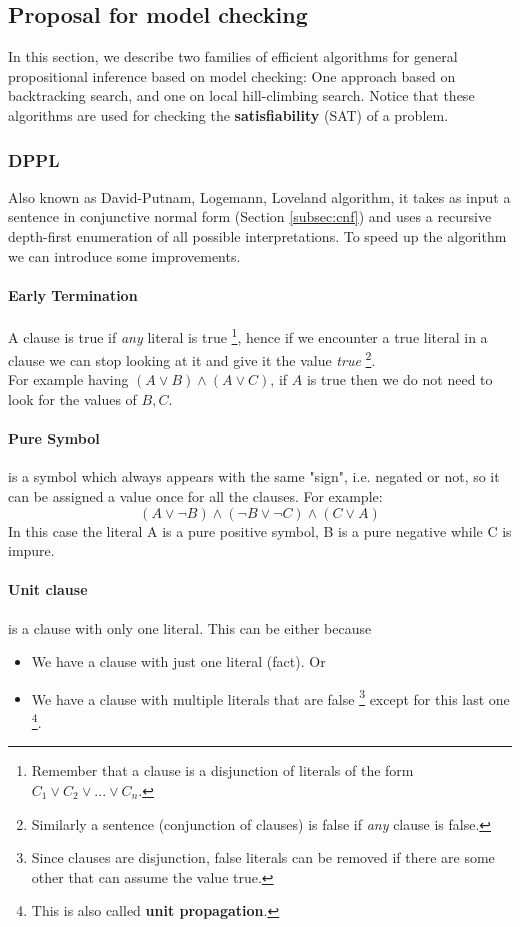 \documentclass[10pt,a4paper]{article}
\begin{document}
\subsection{Proposal for model checking}
\label{subsec:search_alg}
In this section, we describe two families of efficient algorithms for general propositional inference based on model checking: One approach based on backtracking search, and one on local hill-climbing search. Notice that these algorithms are used for checking the \textbf{satisfiability} (SAT) of a problem.

\subsubsection{DPPL}
Also known as David-Putnam, Logemann, Loveland algorithm, it takes as input a sentence in conjunctive normal form (Section \ref{subsec:cnf}) and uses a recursive depth-first enumeration of all possible interpretations. To speed up the algorithm we can introduce some improvements.

\paragraph{Early Termination} A clause is true if \textit{any} literal is true \footnote{Remember that a clause is a disjunction of literals of the form $C_1\vee C_2\vee...\vee C_n$.}, hence if we encounter a true literal in a clause we can stop looking at it and give it the value \textit{true} \footnote{Similarly a sentence (conjunction of clauses) is false if \textit{any} clause is false.}.\\
For example having $(A\vee B)\wedge(A \vee C)$, if $A$ is true then we do not need to look for the values of $B,C$.

\paragraph{Pure Symbol} is a symbol which always appears with the same "sign", i.e. negated or not, so it can be assigned a value once for all the clauses.
For example:
\[(A\vee\neg B)\wedge (\neg B \vee \neg C)\wedge(C \vee A)\]
In this case the literal A is a pure positive symbol, B is a pure negative while C is impure.

\paragraph{Unit clause} is a clause with only one literal. This can be either because
\begin{itemize}
\item We have a clause with just one literal (fact). Or
\item We have a clause with multiple literals that are false \footnote{Since clauses are disjunction, false literals can be removed if there are some other that can assume the value true.} except for this last one \footnote{This is also called \textbf{unit propagation}.}.
\end{itemize}
\end{document}
